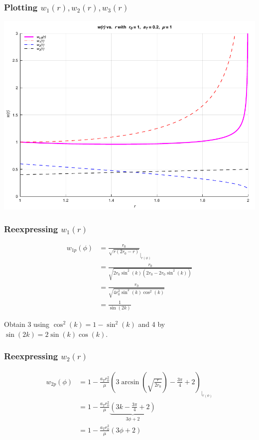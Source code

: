 \documentclass{beamer}
\begin{document}
\begin{frame}
    \frametitle{Plotting $w_1(r),w_2(r),w_3(r)$}

    \begin{center}
        \includegraphics[scale=0.7]{plots/partA_r.pdf}
    \end{center}
\end{frame}

\begin{frame}
    \frametitle{Reexpressing $w_1(r)$}

    \begin{align}
        w_{1p}(\phi)&=\frac{r_{0}}{\sqrt{r\left(2 r_{0}-r\right)}}_{\big\rvert_{r(\phi)}}\\
        &=\frac{r_0}{\sqrt{2r_0\sin^2(k)(2r_0-2r_0\sin^2(k))}}\\
        &=\frac{r_0}{\sqrt{4r_0^2\sin^2(k)\cos^2(k)}}\\
        &=\frac{1}{\sin(2k)}
    \end{align}

    Obtain 3 using $\cos^2(k)=1-\sin^2(k)$ and 4 by $\sin(2k)=2\sin(k)\cos(k)$.
    
\end{frame}

\begin{frame}
    \frametitle{Reexpressing $w_2(r)$}

    \begin{align}
        w_{2p}(\phi)&=1-\frac{a_Tr_0^2}{\mu}\left(3\arcsin(\sqrt{\frac{r}{2r_0}})-\frac{3\pi}{4}+2\right)_{\big\rvert_{r(\phi)}}\\
        &=1-\frac{a_Tr_0^2}{\mu}\underbrace{\left(3k-\frac{3\pi}{4}+2\right)}_{3\phi + 2}\\
        &=1-\frac{a_Tr_0^2}{\mu}\left(3\phi+2\right)
    \end{align}
\end{frame}
\end{document}
